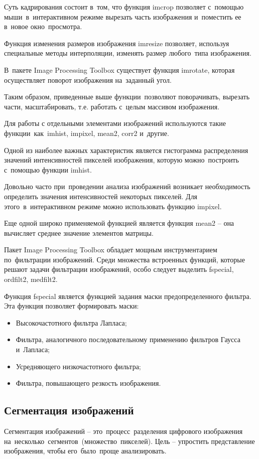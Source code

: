 \documentclass{ou}
\begin{document}
Суть кадрирования состоит в~том, что функция imcrop позволяет с~помощью мыши~в~интерактивном режиме вырезать часть изображения и~поместить ее в~новое окно~просмотра.

Функция изменения размеров изображения imresize позволяет, используя специальные методы интерполяции, изменять размер любого~типа изображения.

В~пакете Image Processing Toolbox существует функция imrotate, которая осуществляет поворот изображения на~заданный угол.

Таким образом, приведенные выше функции~позволяют поворачивать, вырезать части, масштабировать, т.е. работать с~целым массивом изображения.

Для работы с отдельными элементами изображений используются такие функции~как~imhist, impixel, mean2, corr2 и~другие.

Одной из наиболее важных характеристик является гистограмма распределения значений интенсивностей пикселей изображения, которую можно~построить с~помощью функции imhist.

Довольно часто при~проведении анализа изображений возникает необходимость определить значения интенсивностей некоторых пикселей. Для этого~в~интерактивном режиме можно использовать функцию impixel.

Еще одной широко применяемой функцией является функция mean2 -- она вычисляет среднее значение элементов матрицы.

Пакет Image Processing Toolbox обладает мощным инструментарием по~фильтрации изображений. Среди множества встроенных функций, которые решают задачи фильтрации изображений, особо следует выделить fspecial, ordfilt2, medfilt2.

Функция fspecial является функцией задания маски предопределенного фильтра. Эта функция позволяет формировать маски:
\begin{itemize}[label=-, leftmargin=0em, itemindent=3.35em, nosep]
\item Высокочастотного фильтра Лапласа;
\item Фильтра, аналогичного последовательному применению фильтров Гаусса и~Лапласа;
\item Усредняющего низкочастотного фильтра;
\item Фильтра, повышающего резкость изображения\cite{Department_of_Nanosystems_and_Optotechnology2022}.
\end{itemize}
\subsection{Сегментация изображений}
Сегментация изображений -- это~процесс~разделения цифрового изображения на~несколько~сегментов~(множество~пикселей). Цель -- упростить представление изображения, чтобы его~было~проще анализировать. 
\end{document}
